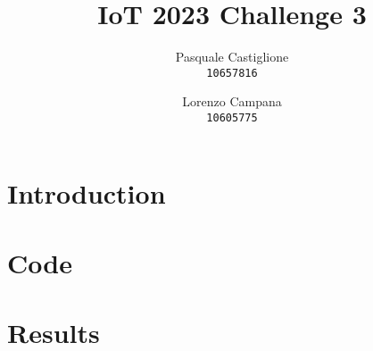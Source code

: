 \documentclass[12pt]{article}
\title{\textbf{IoT 2023 Challenge 3}}
\author{
  Pasquale Castiglione\\
	\texttt{10657816}
  \and
  Lorenzo Campana\\
  \texttt{10605775}
}
\date{}
\begin{document}
	\maketitle

	\section{Introduction}
	\section{Code}
	\section{Results}
\end{document}
